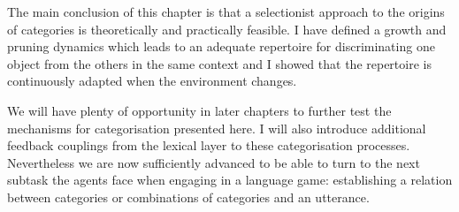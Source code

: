 The main conclusion of this chapter is that a selectionist
approach to the origins of categories
is theoretically and practically feasible. I have 
defined a growth and pruning dynamics which leads to 
an adequate repertoire for 
discriminating one object from the others in the 
same context and I showed that the repertoire is
continuously adapted when the environment changes. 

We will have plenty of opportunity in later chapters
to further test the mechanisms for categorisation 
presented here. I will also introduce 
additional feedback couplings from the lexical 
layer to these categorisation processes. Nevertheless
we are now sufficiently advanced to be able to
turn to the next subtask the agents face when 
engaging in a language game: establishing a relation
between categories or combinations of categories and 
an utterance. 



